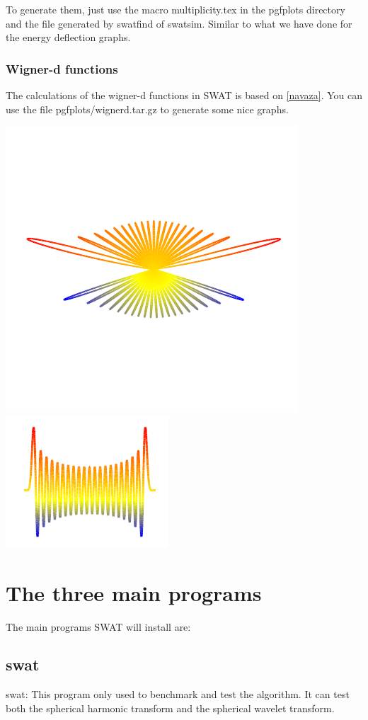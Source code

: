 \documentclass[12pt]{article}
\begin{document}
To generate them, just use the macro multiplicity.tex in the pgfplots directory
and the file generated by swatfind of swatsim. Similar to what we have done for
the energy deflection graphs.

\subsubsection{Wigner-d functions}

The calculations of the wigner-d functions in SWAT is based on \ref{navaza}. You can 
use the file pgfplots/wignerd.tar.gz to generate some nice graphs.

\includegraphics[scale=1.0]{wignerpolar.pdf}  
\includegraphics[scale=1.0]{wigner.pdf} 

\section{The three main programs}
The main programs SWAT will install are:
\subsection{swat}
swat: This program only used to benchmark and test the algorithm. It can test
both the spherical harmonic transform and the spherical wavelet transform.
\end{document}

